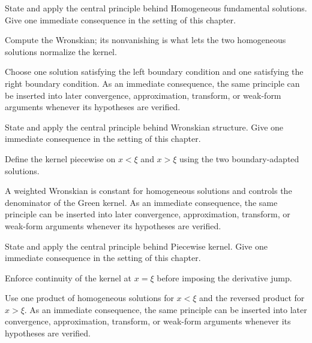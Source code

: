 \begin{exercise}\label{exr:iii26-02}
State and apply the central principle behind Homogeneous fundamental solutions. Give one immediate consequence in the setting of this chapter.
\end{exercise}
\begin{hint}
Compute the Wronskian; its nonvanishing is what lets the two homogeneous solutions normalize the kernel.
\end{hint}
\begin{solution}
Choose one solution satisfying the left boundary condition and one satisfying the right boundary condition. As an immediate consequence, the same principle can be inserted into later convergence, approximation, transform, or weak-form arguments whenever its hypotheses are verified.
\end{solution}

\begin{exercise}\label{exr:iii26-03}
State and apply the central principle behind Wronskian structure. Give one immediate consequence in the setting of this chapter.
\end{exercise}
\begin{hint}
Define the kernel piecewise on \(x<\xi\) and \(x>\xi\) using the two boundary-adapted solutions.
\end{hint}
\begin{solution}
A weighted Wronskian is constant for homogeneous solutions and controls the denominator of the Green kernel. As an immediate consequence, the same principle can be inserted into later convergence, approximation, transform, or weak-form arguments whenever its hypotheses are verified.
\end{solution}

\begin{exercise}\label{exr:iii26-04}
State and apply the central principle behind Piecewise kernel. Give one immediate consequence in the setting of this chapter.
\end{exercise}
\begin{hint}
Enforce continuity of the kernel at \(x=\xi\) before imposing the derivative jump.
\end{hint}
\begin{solution}
Use one product of homogeneous solutions for $x<\xi$ and the reversed product for $x>\xi$. As an immediate consequence, the same principle can be inserted into later convergence, approximation, transform, or weak-form arguments whenever its hypotheses are verified.
\end{solution}

